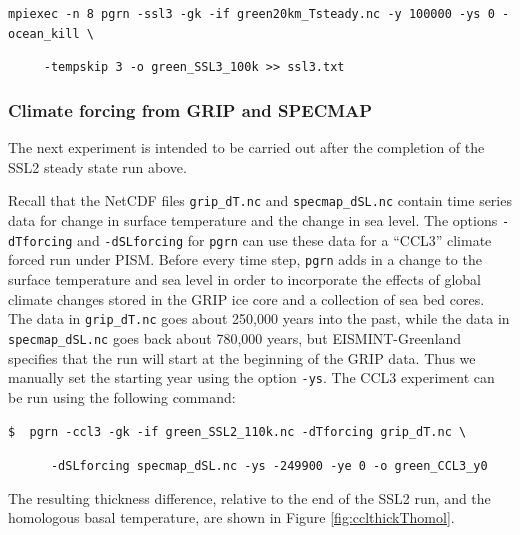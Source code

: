 \documentclass[11pt,final]{amsart}
\begin{document}
\verb|mpiexec -n 8 pgrn -ssl3 -gk -if green20km_Tsteady.nc -y 100000 -ys 0 -ocean_kill \|

\verb|     -tempskip 3 -o green_SSL3_100k >> ssl3.txt|


\subsubsection*{Climate forcing from GRIP and SPECMAP}  The next experiment is intended to be carried out after the completion of the SSL2 steady state run above.

Recall that the NetCDF files \verb|grip_dT.nc| and \verb|specmap_dSL.nc| contain time series data for change in surface temperature and the change in sea level.  The options \verb|-dTforcing| and \verb|-dSLforcing| for \verb|pgrn| can use these data for a ``CCL3'' climate forced run \cite{RitzEISMINT,HuybrechtsEISMINT} under PISM.  Before every time step, \verb|pgrn| adds in a change to the surface temperature and sea level in order to incorporate the effects of global climate changes stored in the GRIP ice core and a collection of sea bed cores.  The data in \verb|grip_dT.nc| goes about 250,000 years into the past, while the data in \verb|specmap_dSL.nc| goes back about 780,000 years, but EISMINT-Greenland specifies that the run will start at the beginning of the GRIP data.  Thus we manually set the starting year using the option \verb|-ys|.  The CCL3 experiment can be run using the following command:

\verb|$  pgrn -ccl3 -gk -if green_SSL2_110k.nc -dTforcing grip_dT.nc \|

\verb|      -dSLforcing specmap_dSL.nc -ys -249900 -ye 0 -o green_CCL3_y0|

The resulting thickness difference, relative to the end of the SSL2 run, and the homologous basal temperature, are shown in Figure \ref{fig:cclthickThomol}.
\end{document}
